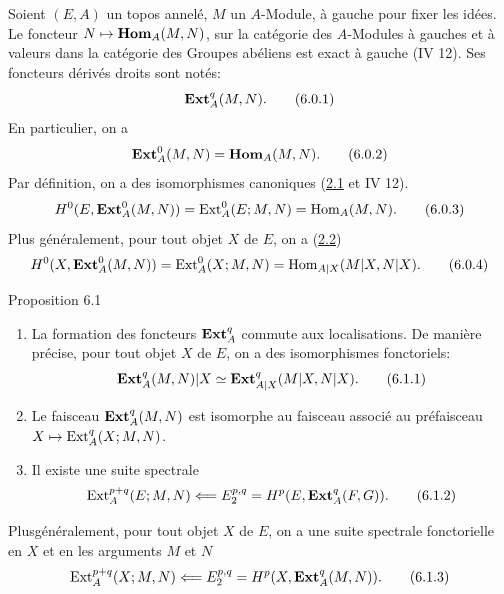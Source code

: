 \documentclass[10pt]{../fichiers-configuration-latex/smfart}
\begin{document}
Soient $(E, A)$ un topos annelé, $M$ un $A$-Module, à gauche pour
fixer les idées. Le foncteur $N \mapsto \operatorname{\mathbf{Hom}}_A(M, N)$, sur
la catégorie des $A$-Modules à gauches et à valeurs dans la
catégorie des Groupes abéliens est exact à gauche (IV 12). Ses
foncteurs dérivés droits sont notés:
\begin{equation*}
\operatorname{\mathbf{Ext}}_A^q(M, N){}.\tag{6.0.1}
\end{equation*}
En particulier, on a
\begin{equation*}
\operatorname{\mathbf{Ext}}_A^{0}(M, N) = \operatorname{\mathbf{Hom}}_A(M, N){}.\tag{6.0.2}
\end{equation*}
Par définition, on a des isomorphismes canoniques (\hyperref[V.subsec2.1]{2.1} et IV 12).
\begin{equation*}
H^{0} (E, \operatorname{\mathbf{Ext}}_A^{0}(M, N)) = \operatorname{Ext}^{0}_A (E;M,
N)=\operatorname{Hom}_A(M, N){}.\tag{6.0.3}
\end{equation*}
Plus généralement, pour tout objet $X$ de $E$, on a (\hyperref[V.subsec2.2]{2.2})
\begin{equation*}
H^{0} (X, \operatorname{\mathbf{Ext}}_A^{0}(M, N)) = \operatorname{Ext}^{0}_A (X;M,
N)=\operatorname{Hom}_{A|X}(M|X, N|X){}.\tag{6.0.4}
\end{equation*}

\begin{enonce*}{Proposition 6.1}
\begin{enumerate}
\renewcommand{\labelenumi}{\theenumi)}
\item La formation des foncteurs $\operatorname{\mathbf{Ext}}^q_A$ commute aux
  localisations. De manière précise, pour tout objet $X$ de $E$,
  on a des isomorphismes fonctoriels:
\begin{equation*}
\operatorname{\mathbf{Ext}}^q_A(M, N) | X \simeq \operatorname{\mathbf{Ext}}^q_{A|X}(M|X, N|X){}.\tag{6.1.1}
\end{equation*}

\item Le faisceau $\operatorname{\mathbf{Ext}}^q_A(M, N)$ est isomorphe au faisceau associé
  au préfaisceau $X \mapsto \operatorname{Ext}^q_A(X;M, N)$.

\item Il existe une suite spectrale
\begin{equation*}
\operatorname{Ext}^{p+q}_A (E;M, N) \Longleftarrow E^{p, q}_2
 = H^p(E, \operatorname{\mathbf{Ext}}^q_A(F, G)){}.\tag{6.1.2}
\end{equation*}
\end{enumerate}
Plus\pageoriginale généralement, pour tout objet $X$ de $E$, on a
une suite spectrale fonctorielle en $X$ et en les arguments $M$ et $N$
\begin{equation*}
\operatorname{Ext}^{p+q}_A (X;M, N) \Longleftarrow E^{p, q}_2
 = H^p(X, \operatorname{\mathbf{Ext}}^q_A(M, N)){}.\tag{6.1.3}
\end{equation*}
\end{enonce*}
\end{document}
